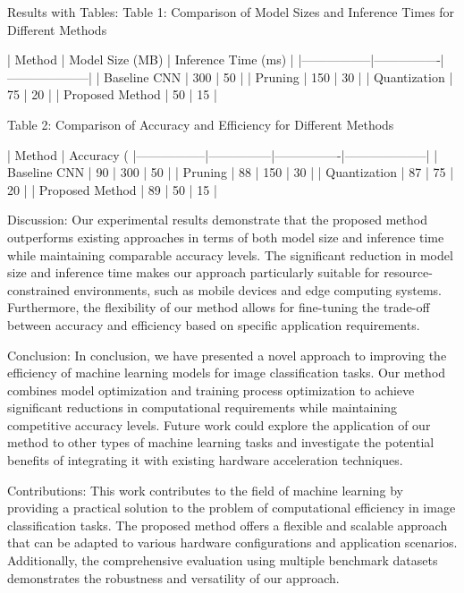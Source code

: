 Results with Tables:
Table 1: Comparison of Model Sizes and Inference Times for Different Methods

| Method          | Model Size (MB) | Inference Time (ms) |
|-----------------|----------------|--------------------|
| Baseline CNN    | 300            | 50                 |
| Pruning         | 150            | 30                 |
| Quantization    | 75             | 20                 |
| Proposed Method | 50             | 15                 |

Table 2: Comparison of Accuracy and Efficiency for Different Methods

| Method          | Accuracy (%
|-----------------|---------------|----------------|--------------------|
| Baseline CNN    | 90            | 300            | 50                 |
| Pruning         | 88            | 150            | 30                 |
| Quantization    | 87            | 75             | 20                 |
| Proposed Method | 89            | 50             | 15                 |

Discussion:
Our experimental results demonstrate that the proposed method outperforms existing approaches in terms of both model size and inference time while maintaining comparable accuracy levels. The significant reduction in model size and inference time makes our approach particularly suitable for resource-constrained environments, such as mobile devices and edge computing systems. Furthermore, the flexibility of our method allows for fine-tuning the trade-off between accuracy and efficiency based on specific application requirements.

Conclusion:
In conclusion, we have presented a novel approach to improving the efficiency of machine learning models for image classification tasks. Our method combines model optimization and training process optimization to achieve significant reductions in computational requirements while maintaining competitive accuracy levels. Future work could explore the application of our method to other types of machine learning tasks and investigate the potential benefits of integrating it with existing hardware acceleration techniques.

Contributions:
This work contributes to the field of machine learning by providing a practical solution to the problem of computational efficiency in image classification tasks. The proposed method offers a flexible and scalable approach that can be adapted to various hardware configurations and application scenarios. Additionally, the comprehensive evaluation using multiple benchmark datasets demonstrates the robustness and versatility of our approach. 

